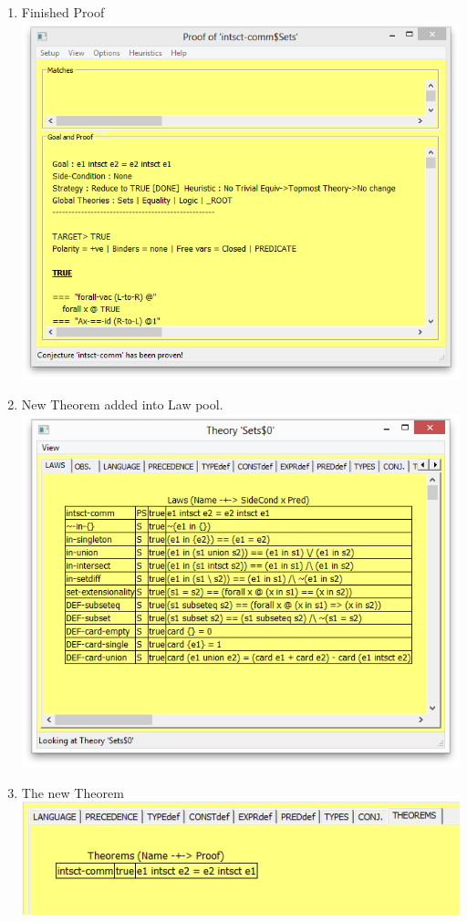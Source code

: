 \begin{enumerate}
  \item Finished Proof
  \\\includegraphics[scale=0.5]{SCREENSHOTS/18-finished-proof.png}
  \newpage
  \item New Theorem added into Law pool.
  \\\includegraphics[scale=0.5]{SCREENSHOTS/19-laws-with-new-theorem-added.png}
  \item The new Theorem
  \\\includegraphics[scale=0.5]{SCREENSHOTS/20-our-new-theorem.png}

\end{enumerate}
